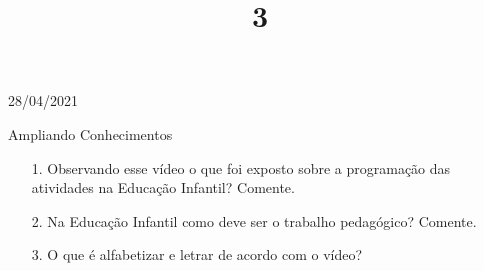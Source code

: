 \documentclass{SchoolBook}
\begin{document}
    \begin{day}{28/04/2021}
        \title{3}{Ampliando Conhecimentos}
        
        \begin{enumerate}
            \item[1.] Observando esse vídeo o que foi exposto sobre a programação das atividades na Educação Infantil? Comente.
            \response{******************}
            
            \item[2.] Na Educação Infantil como deve ser o trabalho pedagógico? Comente.
            \response{******************}
            
            \item[3.] O que é alfabetizar e letrar de acordo com o vídeo?
            \response{******************}
        \end{enumerate}
    \end{day}
    
\end{document}

